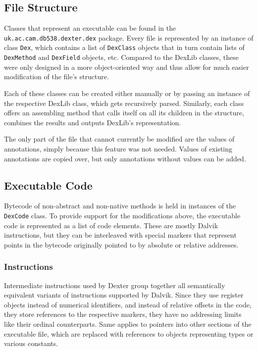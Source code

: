 \documentclass[12pt,twoside,notitlepage]{report}
\begin{document}
\subsection{File Structure}

Classes that represent an executable can be found in the \verb$uk.ac.cam.db538.dexter.dex$ package. Every file is represented by an instance of class \verb$Dex$, which contains a list of \verb$DexClass$ objects that in turn contain lists of \verb$DexMethod$ and \verb$DexField$ objects, etc. Compared to the DexLib classes, these were only designed in a more object-oriented way and thus allow for much easier modification of the file's structure. 

Each of these classes can be created either manually or by passing an instance of the respective DexLib class, which gets recursively parsed. Similarly, each class offers an assembling method that calls itself on all its children in the structure, combines the results and outputs DexLib's representation.

The only part of the file that cannot currently be modified are the values of annotations, simply because this feature was not needed. Values of existing annotations are copied over, but only annotations without values can be added. 

\subsection{Executable Code}

Bytecode of non-abstract and non-native methods is held in instances of the \verb$DexCode$ class. To provide support for the modifications above, the executable code is represented as a list of code elements. These are mostly Dalvik instructions, but they can be interleaved with special markers that represent points in the bytecode originally pointed to by absolute or relative addresses.

\subsubsection{Instructions}

Intermediate instructions used by Dexter group together all semantically equivalent variants of instructions supported by Dalvik. Since they use register objects instead of numerical identifiers, and instead of relative offsets in the code, they store references to the respective markers, they have no addressing limits like their ordinal counterparts. Same applies to pointers into other sections of the executable file, which are replaced with references to objects representing types or various constants. 
\end{document}
